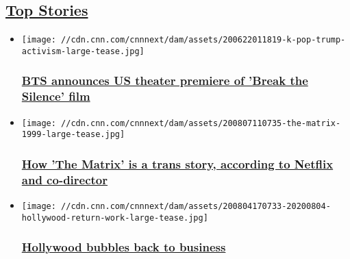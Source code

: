 \hypertarget{top-stories-}{%
\subsection{\texorpdfstring{\href{http://www.cnn.com/entertainment/celebrities}{Top
Stories}~}{Top Stories~}}\label{top-stories-}}

\begin{itemize}
\item
  \href{/2020/08/07/entertainment/bts-break-film-trnd/index.html}{}

  \texttt{[image: //cdn.cnn.com/cnnnext/dam/assets/200622011819-k-pop-trump-activism-large-tease.jpg]}

  \hypertarget{bts-announces-us-theater-premiere-of-break-the-silence-film-}{%
  \subsubsection{\texorpdfstring{\href{/2020/08/07/entertainment/bts-break-film-trnd/index.html}{BTS
  announces US theater premiere of 'Break the Silence' film
  }}{BTS announces US theater premiere of 'Break the Silence' film }}\label{bts-announces-us-theater-premiere-of-break-the-silence-film-}}
\item
  \href{/2020/08/07/entertainment/matrix-transgender-netflix-wachowski-scl-intl/index.html}{}

  \texttt{[image: //cdn.cnn.com/cnnnext/dam/assets/200807110735-the-matrix-1999-large-tease.jpg]}

  \hypertarget{how-the-matrix-is-a-trans-story-according-to-netflix-and-co-director}{%
  \subsubsection{\texorpdfstring{\href{/2020/08/07/entertainment/matrix-transgender-netflix-wachowski-scl-intl/index.html}{How
  'The Matrix' is a trans story, according to Netflix and
  co-director}}{How 'The Matrix' is a trans story, according to Netflix and co-director}}\label{how-the-matrix-is-a-trans-story-according-to-netflix-and-co-director}}
\item
  \href{/2020/08/06/entertainment/entertainment-return-work-newsletter/index.html}{}

  \texttt{[image: //cdn.cnn.com/cnnnext/dam/assets/200804170733-20200804-hollywood-return-work-large-tease.jpg]}

  \hypertarget{hollywood-bubbles-back-to-business}{%
  \subsubsection{\texorpdfstring{\href{/2020/08/06/entertainment/entertainment-return-work-newsletter/index.html}{Hollywood
  bubbles back to
  business}}{Hollywood bubbles back to business}}\label{hollywood-bubbles-back-to-business}}
\end{itemize}

